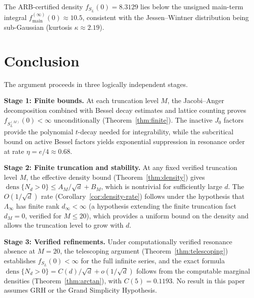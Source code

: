 \documentclass[12pt,reqno]{amsart}
\theoremstyle{plain}
\theoremstyle{definition}
\theoremstyle{remark}
\DeclareMathOperator{\dens}{dens}
\begin{document}
The ARB-certified density $f_{S_L}(0) = 8.3129$ lies below the unsigned main-term integral $f_{\mathrm{main}}^{(\infty)}(0) \approx 10.5$, consistent with the Jessen--Wintner distribution being sub-Gaussian (kurtosis $\kappa \approx 2.19$).


\section{Conclusion}\label{sec:conclusion}

The argument proceeds in three logically independent stages.

\textbf{Stage 1: Finite bounds.}  At each truncation level $M$, the Jacobi--Anger decomposition combined with Bessel decay estimates and lattice counting proves $f_{S_L^{(M)}}(0) < \infty$ unconditionally (Theorem~\ref{thm:finite}).  The inactive $J_0$ factors provide the polynomial $t$-decay needed for integrability, while the subcritical bound on active Bessel factors yields exponential suppression in resonance order at rate $\eta = e/4 \approx 0.68$.

\textbf{Stage 2: Finite truncation and stability.}  At any fixed verified truncation level $M$, the effective density bound (Theorem~\ref{thm:density}) gives $\dens\{N_d > 0\} \leq A_M/\sqrt{d} + B_M$, which is nontrivial for sufficiently large $d$.  The $O(1/\sqrt{d})$ rate (Corollary~\ref{cor:density-rate}) follows under the hypothesis that $\Lambda_\infty$ has finite rank $d_\infty < \infty$ (a hypothesis extending the finite truncation fact $d_M = 0$, verified for $M \leq 20$), which provides a uniform bound on the density and allows the truncation level to grow with $d$.

\textbf{Stage 3: Verified refinements.}  Under computationally verified resonance absence at $M = 20$, the telescoping argument (Theorem~\ref{thm:telescoping}) establishes $f_{S_L}(0) < \infty$ for the full infinite series, and the exact formula $\dens\{N_d > 0\} = C(d)/\sqrt{d} + o(1/\sqrt{d})$ follows from the computable marginal densities (Theorem~\ref{thm:arctan}), with $C(5) = 0.1193$.  No result in this paper assumes GRH or the Grand Simplicity Hypothesis.
\end{document}
